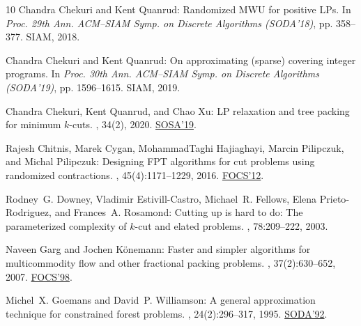 \documentclass[11pt]{article}
\numberwithin{equation}{section}
\theoremstyle{definition}
\theoremstyle{plain}
\begin{document}
\begin{thebibliography}{10}
{\sc Chandra Chekuri and Kent Quanrud}: Randomized {MWU} for positive {LP}s.
\newblock In {\em Proc. 29th Ann. ACM--SIAM Symp. on Discrete Algorithms
  (SODA'18)}, pp. 358--377. SIAM, 2018.
\newblock [\epfmtdoi{10.1137/1.9781611975031.25}]

{\sc Chandra Chekuri and Kent Quanrud}: On approximating (sparse) covering
  integer programs.
\newblock In {\em Proc. 30th Ann. ACM--SIAM Symp. on Discrete Algorithms
  (SODA'19)}, pp. 1596--1615. SIAM, 2019.

{\sc Chandra Chekuri, Kent Quanrud, and Chao Xu}: {LP} relaxation and tree
  packing for minimum $k$-cuts.
, 34(2), 2020.
\newblock \prelim \href{https://doi.org/10.4230/OASIcs.SOSA.2019.7}{SOSA'19}.

{\sc Rajesh Chitnis, Marek Cygan, MohammadTaghi Hajiaghayi, Marcin Pilipczuk,
  and Michal Pilipczuk}: Designing {FPT} algorithms for cut problems using
  randomized contractions.
, 45(4):1171--1229, 2016.
\newblock \prelim \href{https://doi.org/10.1109/FOCS.2012.29}{FOCS'12}.

{\sc Rodney~G. Downey, Vladimir Estivill{-}Castro, Michael~R. Fellows, Elena
  Prieto{-}Rodriguez, and Frances~A. Rosamond}: Cutting up is hard to do: {T}he
  parameterized complexity of $k$-cut and elated problems.
, 78:209--222, 2003.
\newblock [\epfmtdoi{10.1016/S1571-0661(04)81014-4}]

{\sc Naveen Garg and Jochen K{\"{o}}nemann}: Faster and simpler algorithms for
  multicommodity flow and other fractional packing problems.
, 37(2):630--652, 2007.
\newblock \prelim \href{https://doi.org/10.1109/SFCS.1998.743463}{FOCS'98}.
\newblock [\epfmtdoi{10.1137/S0097539704446232}]

{\sc Michel~X. Goemans and David~P. Williamson}: A general approximation
  technique for constrained forest problems.
, 24(2):296--317, 1995.
\newblock \prelim \href{https://dl.acm.org/doi/10.5555/139404.139468}{SODA'92}.
\newblock [\epfmtdoi{10.1137/S0097539793242618}]


\end{thebibliography}
\end{document}
